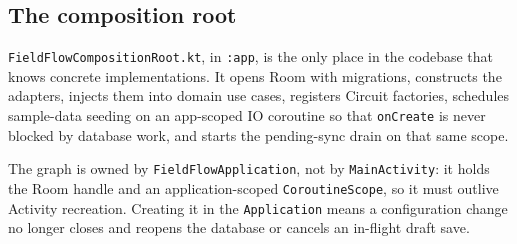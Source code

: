 \documentclass[11pt,a4paper]{article}
\newcommand{\mdl}[1]{\texttt{#1}}
\newcommand{\file}[1]{{\small\texttt{#1}}}
\begin{document}
\subsection{The composition root}

\file{FieldFlowCompositionRoot.kt}, in \mdl{:app}, is the only place in the
codebase that knows concrete implementations. It opens Room with migrations,
constructs the adapters, injects them into domain use cases, registers Circuit
factories, schedules sample-data seeding on an app-scoped IO coroutine so that
\texttt{onCreate} is never blocked by database work, and starts the pending-sync
drain on that same scope.

The graph is owned by \file{FieldFlowApplication}, not by \file{MainActivity}: it
holds the Room handle and an application-scoped \texttt{CoroutineScope}, so it
must outlive Activity recreation. Creating it in the \texttt{Application} means a
configuration change no longer closes and reopens the database or cancels an
in-flight draft save.
\end{document}
